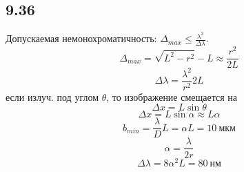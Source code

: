 \subsection*{9.36}
Допускаемая немонохроматичность: $\Delta_{max} \leq \frac{\lambda^2}{\Delta \lambda}$.
$$\Delta_{max} = \sqrt{L^2 - r^2} - L \approx \frac{r^2}{2L}$$
$$\Delta \lambda = \frac{\lambda^2}{r^2} 2L$$
если излуч. под углом $\theta$, то изображение смещается на 
$$\Delta x = L \sin \theta $$
$$\Delta x = L \sin \alpha \approx L \alpha$$
$$b_{min} = \frac{\lambda}{D} L = \alpha L = 10 \ мкм$$
$$\alpha = \frac{\lambda}{2 r}$$
$$\Delta \lambda  = 8 \alpha^2 L = 80 \ нм$$